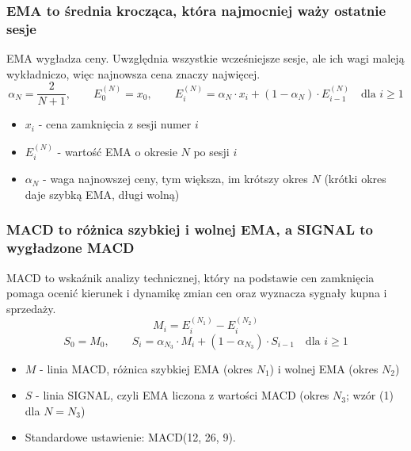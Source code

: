 
\begin{frame}
  \frametitle{EMA to średnia krocząca, która najmocniej waży ostatnie sesje}
  EMA wygładza ceny. Uwzględnia wszystkie wcześniejsze sesje, ale ich wagi
  maleją wykładniczo, więc najnowsza cena znaczy najwięcej.
  \begin{equation*}
    \alpha_N = \frac{2}{N+1},\qquad
    E_0^{(N)} = x_0,\qquad
    E_i^{(N)} = \alpha_N \cdot x_i + (1 - \alpha_N) \cdot E_{i-1}^{(N)}
    \quad\text{dla } i \ge 1
    \tag{1}
  \end{equation*}
  \vskip2mm
  \begin{itemize}
    \item $x_i$ - cena zamknięcia z sesji numer $i$
    \item $E_i^{(N)}$ - wartość EMA o okresie $N$ po sesji $i$
    \item $\alpha_N$ - waga najnowszej ceny, tym większa, im krótszy
      okres $N$ (krótki okres daje szybką EMA, długi wolną)
  \end{itemize}
\end{frame}

\begin{frame}
  \frametitle{MACD to różnica szybkiej i wolnej EMA, a SIGNAL to wygładzone
    MACD}
  MACD to wskaźnik analizy technicznej, który na podstawie cen zamknięcia
  pomaga ocenić kierunek i dynamikę zmian cen oraz wyznacza sygnały kupna
  i sprzedaży.
  \begin{equation*}
    M_i = E_i^{(N_1)} - E_i^{(N_2)}
    \tag{2}
  \end{equation*}
  \begin{equation*}
    S_0 = M_0,\qquad
    S_i = \alpha_{N_3} \cdot M_i + (1 - \alpha_{N_3}) \cdot S_{i-1}
    \quad\text{dla } i \ge 1
    \tag{3}
  \end{equation*}
  \vskip2mm
  \begin{itemize}
    \item $M$ - linia MACD, różnica szybkiej EMA (okres $N_1$) i wolnej
      EMA (okres $N_2$)
    \item $S$ - linia SIGNAL, czyli EMA liczona z wartości MACD
      (okres $N_3$; wzór (1) dla $N = N_3$)
    \item Standardowe ustawienie: MACD(12, 26, 9).
  \end{itemize}
\end{frame}

